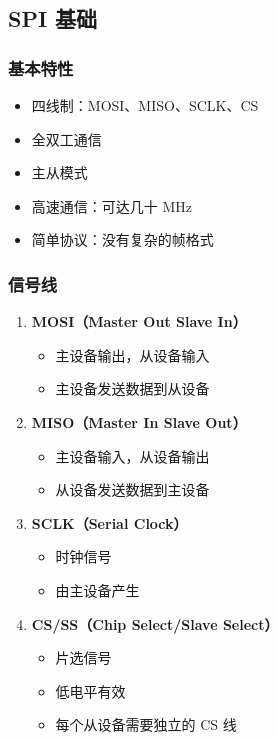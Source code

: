 \subsection{SPI 基础}

\subsubsection{基本特性}

\begin{itemize}
  \item 四线制：MOSI、MISO、SCLK、CS
  \item 全双工通信
  \item 主从模式
  \item 高速通信：可达几十 MHz
  \item 简单协议：没有复杂的帧格式
\end{itemize}

\subsubsection{信号线}

\begin{enumerate}
  \item \textbf{MOSI（Master Out Slave In）}
    \begin{itemize}
      \item 主设备输出，从设备输入
      \item 主设备发送数据到从设备
    \end{itemize}

  \item \textbf{MISO（Master In Slave Out）}
    \begin{itemize}
      \item 主设备输入，从设备输出
      \item 从设备发送数据到主设备
    \end{itemize}

  \item \textbf{SCLK（Serial Clock）}
    \begin{itemize}
      \item 时钟信号
      \item 由主设备产生
    \end{itemize}

  \item \textbf{CS/SS（Chip Select/Slave Select）}
    \begin{itemize}
      \item 片选信号
      \item 低电平有效
      \item 每个从设备需要独立的 CS 线
    \end{itemize}
\end{enumerate}

